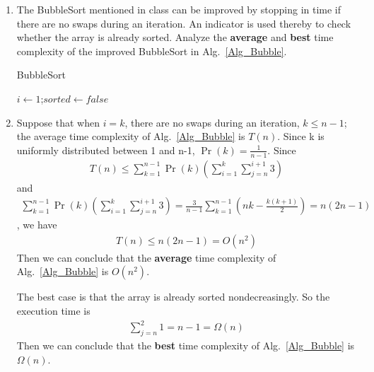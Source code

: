 \documentclass[12pt,a4paper,UTF8]{article}
\makeatletter
\newtheorem*{solution}{Solution}
\theoremstyle{definition}
\renewenvironment{solution}[1][Solution] {\par\pushQED{\qed}\normalfont\topsep6\p@\@plus6\p@\relax\trivlist\item[\hskip\labelsep\bfseries#1\@addpunct{.}]\ignorespaces}{\popQED\endtrivlist\@endpefalse} \makeatother
\makeatother
\begin{document}
\begin{enumerate}
    \item
    The BubbleSort mentioned in class can be improved by stopping in time if there are no swaps during an iteration. An indicator is used thereby to check whether the array is already sorted. Analyze the \textbf{average} and \textbf{best} time complexity of the improved BubbleSort in Alg.~\ref{Alg_Bubble}.

    \begin{minipage}[t]{0.8\textwidth}
    \begin{algorithm}[H]

        \BlankLine
        \caption{BubbleSort}\label{Alg_Bubble}

        $i\leftarrow 1$;$sorted\leftarrow false$\;

    \end{algorithm}
    \end{minipage}

    \begin{solution}
        Suppose that when $ i = k $, there are no swaps during an iteration, $k \leq n-1$; the average time complexity of Alg.~\ref{Alg_Bubble} is $T(n)$. Since k is uniformly distributed between 1 and n-1, $ \Pr(k) = \frac{1}{n-1} $. Since
        \begin{align*}
        T(n) \leq \sum_{k=1}^{n-1} \Pr(k)( \sum_{i=1}^{k}\sum_{j=n}^{i+1}3 )
        \end{align*}
        and
        \begin{align*}
        \sum_{k=1}^{n-1} \Pr(k)( \sum_{i=1}^{k}\sum_{j=n}^{i+1}3 ) = \frac{3}{n-1}\sum_{k=1}^{n-1}(nk - \frac{k(k+1)}{2}) = n(2n-1)
        \end{align*}
        , we have
        \begin{align*}
        T(n) \leq n(2n-1) = O(n^2)
        \end{align*}
        Then we can conclude that the \textbf{average} time complexity of Alg.~\ref{Alg_Bubble} is $O(n^2)$.
        
        The best case is that the array is already sorted nondecreasingly. So the execution time is
        \begin{align*}
        \sum_{j = n}^{2} 1 = n - 1 = \Omega(n)
        \end{align*}
        Then we can conclude that the \textbf{best} time complexity of Alg.~\ref{Alg_Bubble} is $\Omega(n)$.
    \end{solution}


\end{enumerate}
\end{document}
